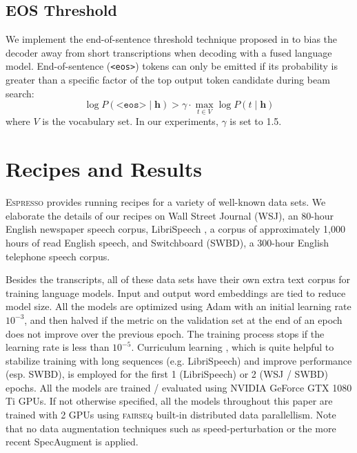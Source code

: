 \documentclass{article}
\def\espresso{\textsc{Espresso}\xspace}
\def\fairseq{\textsc{fairseq}\xspace}
\begin{document}
\subsection{EOS Threshold}
We implement the end-of-sentence threshold technique proposed in \cite{hannun2019sequence} to bias the decoder away from short transcriptions when decoding with a fused language model. End-of-sentence (\texttt{<eos>}) tokens can only be emitted if its probability is greater than a specific factor of the top output token candidate during beam search:
\begin{equation}
    \log P(\texttt{<eos>} \mid \textbf{h}) > \gamma \cdot \max_{t \in V} \log P(t \mid \textbf{h})
\end{equation}
where $V$ is the vocabulary set. In our experiments, $\gamma$ is set to 1.5.

\section{Recipes and Results}
\label{sec:res}
\espresso provides running recipes for a variety of well-known data sets. We elaborate the details of our recipes on Wall Street Journal \cite{paulb92} (WSJ), an 80-hour English newspaper speech corpus, LibriSpeech \cite{panayotovcpk15}, a corpus of approximately 1,000 hours of read English speech, and Switchboard \cite{godfrey1992switchboard} (SWBD), a 300-hour English telephone speech corpus. 

Besides the transcripts, all of these data sets have their own extra text corpus for training language models. Input and output word embeddings are tied \cite{press2017using} to reduce model size. All the models are optimized using Adam \cite{kingma2015adam} with an initial learning rate $10^{-3}$, and then halved if the metric on the validation set at the end of an epoch does not improve over the previous epoch. The training process stops if the learning rate is less than $10^{-5}$. Curriculum learning \cite{bengio2009curriculum}, which is quite helpful to stabilize training with long sequences (e.g. LibriSpeech) and improve performance (esp. SWBD), is employed for the first 1 (LibriSpeech) or 2 (WSJ / SWBD) epochs. All the models are trained / evaluated using NVIDIA GeForce GTX 1080 Ti GPUs. If not otherwise specified, all the models throughout this paper are trained with 2 GPUs using \fairseq built-in distributed data parallellism. Note that no data augmentation techniques such as speed-perturbation \cite{ko2015audio} or the more recent SpecAugment \cite{specaugment} is applied.
\end{document}
